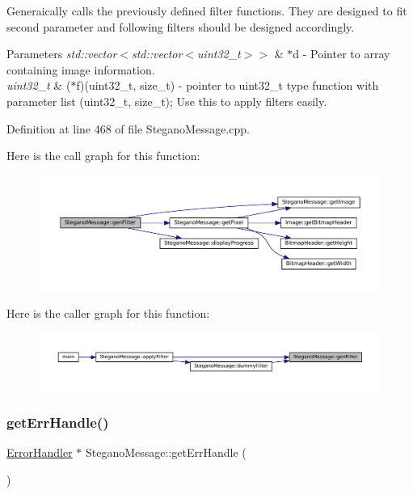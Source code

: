 Generaically calls the previously defined filter functions. They are designed to fit second parameter and following filters should be designed accordingly. 


\begin{DoxyParams}{Parameters}
{\em std\+::vector$<$std\+::vector$<$uint32\+\_\+t$>$$>$} & $\ast$d -\/ Pointer to array containing image information. \\
\hline
{\em uint32\+\_\+t} & ($\ast$f)(uint32\+\_\+t, size\+\_\+t) -\/ pointer to uint32\+\_\+t type function with parameter list (uint32\+\_\+t, size\+\_\+t); Use this to apply filters easily. \\
\hline
\end{DoxyParams}


Definition at line 468 of file Stegano\+Message.\+cpp.

Here is the call graph for this function\+:\nopagebreak
\begin{figure}[H]
\begin{center}
\leavevmode
\includegraphics[width=350pt]{classSteganoMessage_a1cb326688e9a054127396d198bd6f976_cgraph}
\end{center}
\end{figure}
Here is the caller graph for this function\+:\nopagebreak
\begin{figure}[H]
\begin{center}
\leavevmode
\includegraphics[width=350pt]{classSteganoMessage_a1cb326688e9a054127396d198bd6f976_icgraph}
\end{center}
\end{figure}
\mbox{\label{classSteganoMessage_a0134757a8c79caa9dca9bcce0686d1ef}} 
\subsubsection{\texorpdfstring{getErrHandle()}{getErrHandle()}}
{\footnotesize\ttfamily \mbox{\hyperlink{classErrorHandler}{Error\+Handler}} $\ast$ Stegano\+Message\+::get\+Err\+Handle (\begin{DoxyParamCaption}{ }\end{DoxyParamCaption})}



